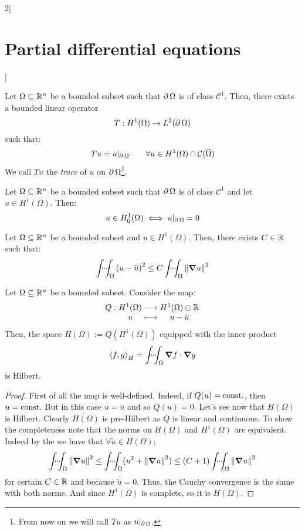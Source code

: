 \documentclass[../../../main_math.tex]{subfiles}
\begin{document}
\begin{multicols}{2}[\section{Partial differential equations}]
\begin{definition}
  \end{definition}
  \begin{theorem}
    Let $\Omega\subseteq \mathbb{R}^n$ be a bounded subset such that $\operatorname{\partial}{\Omega}$ is of class $\mathcal{C}^1$. Then, there exists a bounded linear operator
    $$T:H^1(\Omega)\rightarrow L^2(\operatorname{\partial}{\Omega})$$
    such that:
    $$Tu=u|_{\operatorname{\partial}{\Omega}}\qquad\forall u\in H^1(\Omega)\cap \mathcal{C}(\overline{\Omega})$$
    We call $Tu$ the \emph{trace} of $u$ on $\operatorname{\partial}{\Omega}$\footnote{From now on we will call $Tu$ as $u|_{\operatorname{\partial}{\Omega}}$.}.
  \end{theorem}
  \begin{theorem}\label{PDE:traceequivalence}
    Let $\Omega\subseteq \mathbb{R}^n$ be a bounded subset such that $\operatorname{\partial}{\Omega}$ is of class $\mathcal{C}^1$ and let $u\in H^1(\Omega)$. Then:
    $$u\in H_0^1(\Omega)\iff u|_{\operatorname{\partial}{\Omega}}=0$$
  \end{theorem}
  \begin{proposition}\label{PDE:poincareinequality}
    Let $\Omega\subseteq \mathbb{R}^n$ be a bounded subset and $u\in H^1(\Omega)$. Then, there exists $C\in\mathbb{R}$ such that:
    $$\idotsint_\Omega{(u-\overline{u})}^2\leq C\idotsint_\Omega\left\|\grad u\right\|^2$$
  \end{proposition}
  \begin{proposition}
    Let $\Omega\subseteq \mathbb{R}^n$ be a bounded subset. Consider the map:
    $$\function{Q}{H^1(\Omega)}{H^1(\Omega)\ominus\RR}{u}{u-\overline{u}}$$
    Then, the space $H(\Omega):=Q(H^1(\Omega))$ equipped with the inner product $${\left\langle f,g\right\rangle}_{H}=\idotsint_\Omega \grad{f}\cdot \grad{g}$$
    is Hilbert.
  \end{proposition}
  \begin{proof}
    First of all the map is well-defined. Indeed, if $Q(u)=\text{const.}$, then $u=\text{const.}$ But in this case $u=\overline{u}$ and so $Q(u)=0$. Let's see now that $H(\Omega)$ is Hilbert.
    Clearly $H(\Omega)$ is pre-Hilbert as $Q$ is linear and continuous. To show the completeness note that the norms on $H(\Omega)$ and $H^1(\Omega)$ are equivalent. Indeed by the  we have that $\forall \tilde{u}\in H(\Omega)$:
    $$\idotsint_\Omega \left\|\grad{u}\right\|^2\leq\idotsint_\Omega (u^2+\left\|\grad{u}\right\|^2)\leq(C+1)\idotsint_\Omega \left\|\grad{u}\right\|^2$$
    for certain $C\in\mathbb{R}$ and because $\overline{\tilde{u}}=0$. Thus, the Cauchy convergence is the same with both norms. And since $H^1(\Omega)$ is complete, so it is $H(\Omega)$.

\end{proof}
\end{multicols}
\end{document}

